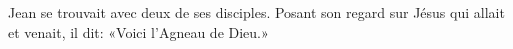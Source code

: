 \encetemps Jean se trouvait avec deux de ses disciples.
Posant son regard sur Jésus qui allait et venait, il dit:
	«Voici l’Agneau de Dieu.»
